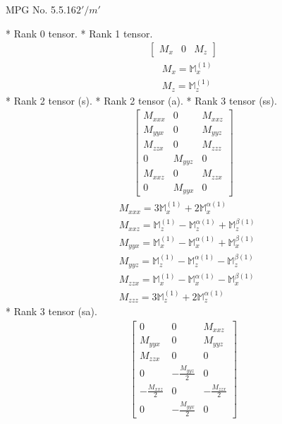 \documentclass[fleqn,8pt,landscape]{jsarticle}
\begin{document}
\setcounter{MaxMatrixCols}{32}

\renewcommand{\tablename}{Table~}
\renewcommand{\figurename}{Figure~}
\begin{center}
\LARGE
MPG No. 5.5.16\quad$2'/m'$
\end{center}
* Rank 0 tensor.
* Rank 1 tensor.
\begin{align*}
\begin{bmatrix} M_{x} & 0 & M_{z} \end{bmatrix}
\end{align*}
\begin{align*}
& M_{x} = \mathbb{M}_{x}^{(1)} \\
& M_{z} = \mathbb{M}_{z}^{(1)}
\end{align*}
* Rank 2 tensor (s).
* Rank 2 tensor (a).
* Rank 3 tensor (ss).
\begin{align*}
\begin{bmatrix} M_{xxx} & 0 & M_{xxz} \\ M_{yyx} & 0 & M_{yyz} \\ M_{zzx} & 0 & M_{zzz} \\ 0 & M_{yyz} & 0 \\ M_{xxz} & 0 & M_{zzx} \\ 0 & M_{yyx} & 0 \end{bmatrix}
\end{align*}
\begin{align*}
& M_{xxx} = 3 \mathbb{M}_{x}^{(1)} + 2 \mathbb{M}_{x}^{\alpha(1)} \\
& M_{xxz} = \mathbb{M}_{z}^{(1)} - \mathbb{M}_{z}^{\alpha(1)} + \mathbb{M}_{z}^{\beta(1)} \\
& M_{yyx} = \mathbb{M}_{x}^{(1)} - \mathbb{M}_{x}^{\alpha(1)} + \mathbb{M}_{x}^{\beta(1)} \\
& M_{yyz} = \mathbb{M}_{z}^{(1)} - \mathbb{M}_{z}^{\alpha(1)} - \mathbb{M}_{z}^{\beta(1)} \\
& M_{zzx} = \mathbb{M}_{x}^{(1)} - \mathbb{M}_{x}^{\alpha(1)} - \mathbb{M}_{x}^{\beta(1)} \\
& M_{zzz} = 3 \mathbb{M}_{z}^{(1)} + 2 \mathbb{M}_{z}^{\alpha(1)}
\end{align*}
* Rank 3 tensor (sa).
\begin{align*}
\begin{bmatrix} 0 & 0 & M_{xxz} \\ M_{yyx} & 0 & M_{yyz} \\ M_{zzx} & 0 & 0 \\ 0 & - \frac{M_{yyz}}{2} & 0 \\ - \frac{M_{xxz}}{2} & 0 & - \frac{M_{zzx}}{2} \\ 0 & - \frac{M_{yyx}}{2} & 0 \end{bmatrix}
\end{align*}
\end{document}
